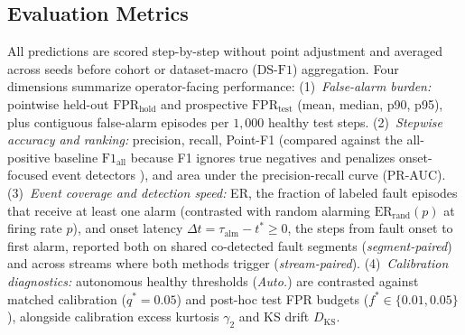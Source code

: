 \subsection{Evaluation Metrics}
\label{subsec:eval_metrics}
All predictions are scored step-by-step without point adjustment \cite{kim2022towards} and averaged across seeds before cohort or dataset-macro ($\text{DS-F1}$) aggregation. Four dimensions summarize operator-facing performance:
(1)~\emph{False-alarm burden:} pointwise held-out $\text{FPR}_{\text{hold}}$ and prospective $\text{FPR}_{\text{test}}$ (mean, median, p90, p95), plus contiguous false-alarm episodes per $1{,}000$ healthy test steps.
(2)~\emph{Stepwise accuracy and ranking:} precision, recall, Point-F1 (compared against the all-positive baseline $\text{F1}_{\text{all}}$ because F1 ignores true negatives \cite{chicco2020advantages} and penalizes onset-focused event detectors \cite{garg2022evaluation}), and area under the precision-recall curve (PR-AUC).
(3)~\emph{Event coverage and detection speed:} ER, the fraction of labeled fault episodes that receive at least one alarm (contrasted with random alarming $\text{ER}_{\text{rand}}(p)$ at firing rate $p$), and onset latency $\Delta t = \tau_{\text{alm}} - t^* \ge 0$, the steps from fault onset to first alarm, reported both on shared co-detected fault segments (\emph{segment-paired}) and across streams where both methods trigger (\emph{stream-paired}).
(4)~\emph{Calibration diagnostics:} autonomous healthy thresholds (\emph{Auto.}) are contrasted against matched calibration ($q^*=0.05$) and post-hoc test FPR budgets ($f^* \in \{0.01, 0.05\}$), alongside calibration excess kurtosis $\gamma_2$ and KS drift $D_{\text{KS}}$.
